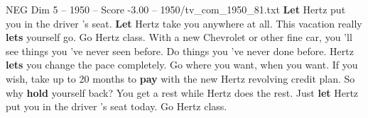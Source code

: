 \begin{textsample}{NEG Dim 5 – 1950 – Score -3.00 – 1950/tv\_com\_1950\_81.txt}  \label{ex:f5_neg_049}
\textbf{Let} Hertz put you in the driver 's seat. \textbf{Let} Hertz take you anywhere at all.
This vacation really \textbf{lets} yourself go.
Go Hertz class.
With a new Chevrolet or other fine car, you 'll see things you 've never seen before.
Do things you 've never done before.
Hertz \textbf{lets} you change the pace completely.
Go where you want, when you want.
If you wish, take up to 20 months to \textbf{pay} with the new Hertz revolving credit plan.
So why \textbf{hold} yourself back?
You get a rest while Hertz does the rest.
Just \textbf{let} Hertz put you in the driver 's seat today.
Go Hertz class.

\end{textsample}
